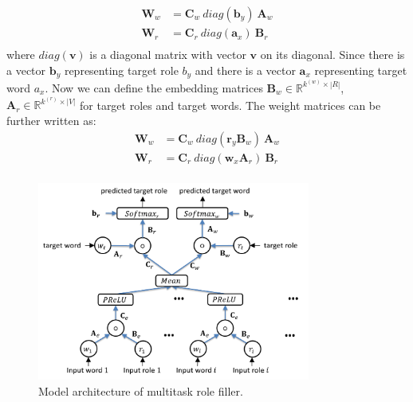 \documentclass[a4paper]{article}
\begin{document}
\begin{equation} \label{eq:cls}
\begin{aligned}
    \mathbf{W}_w
        &= \mathbf{C}_w \ diag(\mathbf{b}_y) \ \mathbf{A}_w \\
    \mathbf{W}_r
        &= \mathbf{C}_r \ diag(\mathbf{a}_x) \ \mathbf{B}_r \\
\end{aligned}
\end{equation}
where $diag(\mathbf{v})$ is a diagonal matrix with vector $\mathbf{v}$ on its diagonal. Since there is a vector $\mathbf{b}_y$ representing target role $b_y$ and there is a vector $\mathbf{a}_x$ representing target word $a_x$. Now we can define the embedding matrices $\mathbf{B}_w \in \mathbb{R}^{k^{(w)} \times |R|}$, $\mathbf{A}_r \in \mathbb{R}^{k^{(r)} \times |V|}$ for target roles and target words. The weight matrices can be further written as: 
\begin{equation} \label{eq:cls_temb}
\begin{aligned}
    \mathbf{W}_w
        &= \mathbf{C}_w \ diag(\mathbf{r}_y \mathbf{B}_w) \ \mathbf{A}_w \\
    \mathbf{W}_r
        &= \mathbf{C}_r \ diag(\mathbf{w}_x \mathbf{A}_r) \ \mathbf{B}_r \\
\end{aligned}
\end{equation}



\begin{figure}[t]
\centering
\includegraphics[width=0.8\textwidth]{BOP.png}
\caption{\label{fig:BOP} Model architecture of multitask role filler.}
\end{figure}
\end{document}
